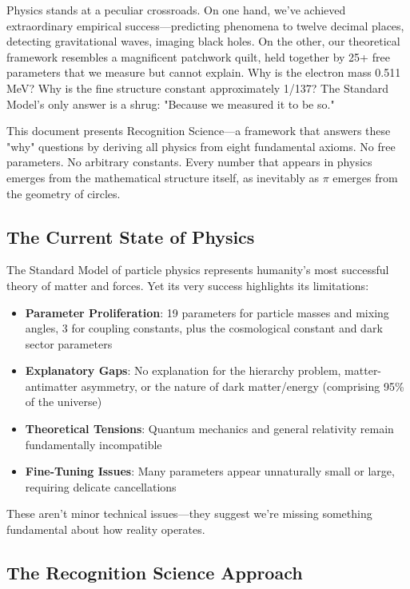 \documentclass[12pt,a4paper]{article}
\theoremstyle{definition}
\begin{document}
Physics stands at a peculiar crossroads. On one hand, we've achieved extraordinary empirical success—predicting phenomena to twelve decimal places, detecting gravitational waves, imaging black holes. On the other, our theoretical framework resembles a magnificent patchwork quilt, held together by 25+ free parameters that we measure but cannot explain. Why is the electron mass 0.511 MeV? Why is the fine structure constant approximately 1/137? The Standard Model's only answer is a shrug: "Because we measured it to be so."

This document presents Recognition Science—a framework that answers these "why" questions by deriving all physics from eight fundamental axioms. No free parameters. No arbitrary constants. Every number that appears in physics emerges from the mathematical structure itself, as inevitably as $\pi$ emerges from the geometry of circles.

\subsection{The Current State of Physics}

The Standard Model of particle physics represents humanity's most successful theory of matter and forces. Yet its very success highlights its limitations:

\begin{itemize}
    \item \textbf{Parameter Proliferation}: 19 parameters for particle masses and mixing angles, 3 for coupling constants, plus the cosmological constant and dark sector parameters
    \item \textbf{Explanatory Gaps}: No explanation for the hierarchy problem, matter-antimatter asymmetry, or the nature of dark matter/energy (comprising 95\% of the universe)
    \item \textbf{Theoretical Tensions}: Quantum mechanics and general relativity remain fundamentally incompatible
    \item \textbf{Fine-Tuning Issues}: Many parameters appear unnaturally small or large, requiring delicate cancellations
\end{itemize}

These aren't minor technical issues—they suggest we're missing something fundamental about how reality operates.

\subsection{The Recognition Science Approach}
\end{document}
